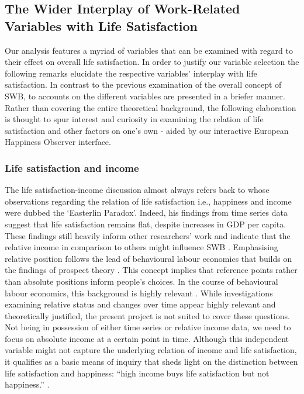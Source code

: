 \documentclass[preprint,12pt,authoryear]{elsarticle}
\begin{document}
	\subsection{The Wider Interplay of Work-Related Variables with Life Satisfaction}
Our analysis features a myriad of variables that can be examined with regard to their effect on overall life satisfaction.
In order to justify our variable selection the following remarks elucidate the respective variables' interplay with life satisfaction.
In contrast to the previous examination of the overall concept of SWB, to accounts on the different variables are presented 
in a briefer manner. Rather than covering the entire theoretical background, the following elaboration is thought to spur interest
and curiosity in examining the relation of life satisfaction and other factors on one's own - aided by our interactive 
European Happiness Observer interface. 

\subsubsection{Life satisfaction and income}
The life satisfaction-income discussion almost always refers back to \citet{easterlin_does_1974} whose observations regarding
the relation of life satisfaction i.e., happiness and income were dubbed the `Easterlin Paradox'. Indeed, his findings from time series data
suggest that life satisfaction remains flat, despite increases in GDP per capita. These findings still heavily inform other researchers'
work and indicate that the relative income in comparison to others might influence SWB \citep{di_tella_happiness_2010,drichoutis_reference_2010,pedersen_happiness_2011}.
Emphasising relative position follows the lead of behavioural labour economics that builds on the findings of prospect theory \citep{kahneman_prospect_1979}.
This concept implies that reference points rather than absolute positions inform people's choices. In the course of behavioural
labour economics, this background is highly relevant \citep{dohmen_behavioral_2014}. 
While investigations examining relative status and changes over time appear highly relevant and theoretically justified, the present
project is not suited to cover these questions. Not being in possession of either time series or relative income data, we need
to focus on absolute income at a certain point in time. Although this independent variable might not capture the underlying relation
of income and life satisfaction, it qualifies as a basic means of inquiry that sheds light on the distinction between life satisfaction
and happiness: “high income buys life satisfaction but not happiness.” \citep[p. 16489]{kahneman_high_2010}. 
\end{document}
